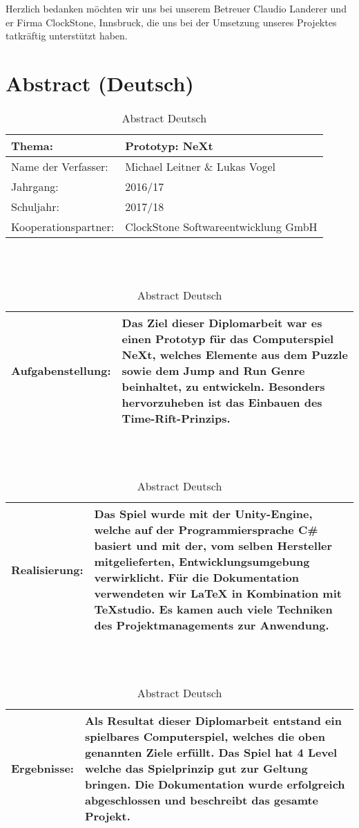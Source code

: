 Herzlich bedanken möchten wir uns bei unserem Betreuer Claudio Landerer und er Firma ClockStone, Innsbruck, die uns bei der Umsetzung unseres Projektes tatkräftig unterstützt haben. 


\chapter*{Abstract (Deutsch)}
\def \currentAuthor {Lukas Vogel}
\begin{table}[H]
	
	\renewcommand{\arraystretch}{1.5}
\begin{tabular}{|p{4cm}|p{10cm}|}
	\hline 
	Thema: &  Prototyp: NeXt\\ 
	\hline
	 Name der Verfasser: & Michael Leitner \& Lukas Vogel  \\ 
	\hline 
	Jahrgang: & 2016/17 \\
	\hline
	 Schuljahr: & 2017/18 \\
	\hline 
	Kooperationspartner: & ClockStone Softwareentwicklung GmbH\\
	\hline
\end{tabular}
\ \\
\ \\
\begin{tabular}{|p{4cm}|p{10cm}|}
	\hline
	Aufgabenstellung: & Das Ziel dieser Diplomarbeit war es einen Prototyp für das Computerspiel NeXt, welches Elemente aus dem Puzzle sowie dem Jump and Run Genre beinhaltet, zu entwickeln. Besonders hervorzuheben ist das Einbauen des Time-Rift-Prinzips. \\
	\hline
\end{tabular} 
\ \\
\ \\
\begin{tabular}{|p{4cm}|p{10cm}|}
	\hline
	Realisierung: & Das Spiel wurde mit der Unity-Engine, welche auf der
	Programmiersprache C\# basiert und mit der, vom selben Hersteller mitgelieferten, Entwicklungsumgebung verwirklicht. Für die Dokumentation verwendeten wir LaTeX in Kombination mit TeXstudio. Es kamen auch viele Techniken des Projektmanagements zur Anwendung.\\
	\hline
\end{tabular}
\ \\
\ \\
\begin{tabular}{|p{4cm}|p{10cm}|}
	\hline
	Ergebnisse: & Als Resultat dieser Diplomarbeit entstand ein spielbares Computerspiel, welches die oben genannten Ziele erfüllt. Das Spiel hat 4 Level welche das Spielprinzip gut zur Geltung bringen. Die Dokumentation wurde erfolgreich abgeschlossen und beschreibt das gesamte Projekt. \\
	\hline
\end{tabular}
\caption{Abstract Deutsch}
\end{table}
